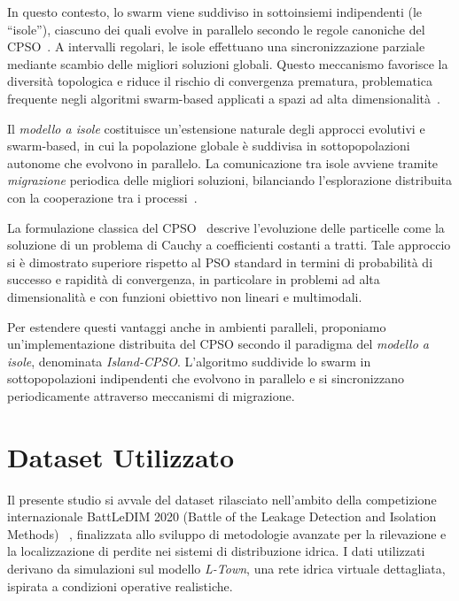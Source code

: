 \documentclass{article}
\begin{document}
In questo contesto, lo swarm viene suddiviso in sottoinsiemi indipendenti (le “isole”), ciascuno dei 
quali evolve in parallelo secondo le regole canoniche del CPSO~\cite{Ricciardello2020}. A intervalli 
regolari, le isole effettuano una sincronizzazione parziale mediante scambio delle migliori soluzioni 
globali. Questo meccanismo favorisce la diversità topologica e riduce il rischio di convergenza prematura, 
problematica frequente negli algoritmi swarm-based applicati a spazi ad alta dimensionalità~\cite{omran2005dynamic}.

Il \textit{modello a isole} costituisce un’estensione naturale degli approcci evolutivi e swarm-based, in cui 
la popolazione globale è suddivisa in sottopopolazioni autonome che evolvono in parallelo. La comunicazione 
tra isole avviene tramite \textit{migrazione} periodica delle migliori soluzioni, bilanciando l'esplorazione 
distribuita con la cooperazione tra i processi~\cite{tomassini2005spatially, cantupaz1998survey}.

La formulazione classica del CPSO~\cite{Ricciardello2020} descrive l’evoluzione delle particelle come la 
soluzione di un problema di Cauchy a coefficienti costanti a tratti. Tale approccio si è dimostrato 
superiore rispetto al PSO standard in termini di probabilità di successo e rapidità di convergenza, in 
particolare in problemi ad alta dimensionalità e con funzioni obiettivo non lineari e multimodali.

Per estendere questi vantaggi anche in ambienti paralleli, proponiamo un’implementazione distribuita del 
CPSO secondo il paradigma del \textit{modello a isole}, denominata \textit{Island-CPSO}. L’algoritmo 
suddivide lo swarm in sottopopolazioni indipendenti che evolvono in parallelo e si sincronizzano 
periodicamente attraverso meccanismi di migrazione.

\section{Dataset Utilizzato}

Il presente studio si avvale del dataset rilasciato nell'ambito della competizione internazionale 
BattLeDIM 2020 (Battle of the Leakage Detection and Isolation Methods) ~\cite{battle2020}, finalizzata allo 
sviluppo di metodologie avanzate per la rilevazione e la localizzazione di perdite nei sistemi di distribuzione 
idrica. I dati utilizzati derivano da simulazioni sul modello \emph{L-Town}, una rete idrica virtuale dettagliata, 
ispirata a condizioni operative realistiche.
\end{document}

